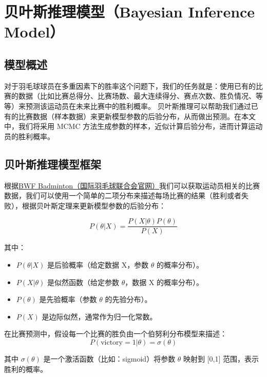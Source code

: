 \documentclass[12pt]{article}
\begin{document}
\section{贝叶斯推理模型（Bayesian Inference Model）}

\subsection{模型概述}

对于羽毛球球员在多重因素下的胜率这个问题下，我们的任务就是：使用已有的比赛的数据（比如比赛总得分、比赛场数、最大连续得分、赛点次数、胜负情况、等等）来预测该运动员在未来比赛中的胜利概率。
贝叶斯推理可以帮助我们通过已有的比赛数据（样本数据）来更新模型参数的后验分布，从而做出预测。在本文中，我们将采用 MCMC 方法生成参数的样本，近似计算后验分布，进而计算运动员的胜利概率。

\subsection{贝叶斯推理模型框架}
根据\href{https://bwfbadminton.com/zh-cn/}{BWF Badminton（国际羽毛球联合会官网）}我们可以获取运动员相关的比赛数据，我们可以使用一个简单的二项分布来描述每场比赛的结果（胜利或者失败），根据贝叶斯定理来更新模型参数的后验分布：

\begin{equation}P(\theta|X)=\frac{P(X|\theta)P(\theta)}{P(X)}\end{equation}

其中：
\begin{itemize}
	\item $P(\theta|X)$ 是后验概率（给定数据 X，参数 $\theta$ 的概率分布）。
	\item $P(X|\theta)$ 是似然函数（给定参数 $\theta$，数据 X 的概率分布）。
	\item $P(\theta)$ 是先验概率（参数 $\theta$ 的先验分布）。
	\item $P(X)$ 是边际似然，通常作为归一化常数。
	\end{itemize}
在比赛预测中，假设每一个比赛的胜负由一个伯努利分布模型来描述：
\begin{equation}
	P(\mathrm{victory}=1|\theta)=\sigma(\theta)
	\end{equation}

其中 $\sigma(\theta)$ 是一个激活函数（比如：sigmoid）将参数 $\theta$ 映射到 [0,1] 范围，表示胜利的概率。
\end{document}
